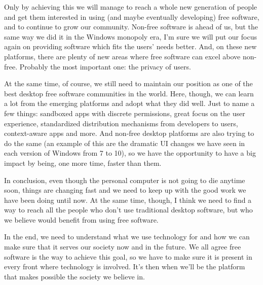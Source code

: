 Only by achieving this we will manage to reach a whole new generation of people and get them interested in using (and maybe eventually developing) free software, and to continue to grow our community. Non-free software is ahead of us, but the same way we did it in the Windows monopoly era, I’m sure we will put our focus again on providing software which fits the users’ needs better. And, on these new platforms, there are plenty of new areas where free software can excel above non-free. Probably the most important one: the privacy of users.

At the same time, of course, we still need to maintain our position as one of the best desktop free software communities in the world. Here, though, we can learn a lot from the emerging platforms and adopt what they did well. Just to name a few things: sandboxed apps with discrete permissions, great focus on the user experience, standardized distribution mechanisms from developers to users, context-aware apps and more. And non-free desktop platforms are also trying to do the same (an example of this are the dramatic UI changes we have seen in each version of Windows from 7 to 10), so we have the opportunity to have a big impact by being, one more time, faster than them.

In conclusion, even though the personal computer is not going to die anytime soon, things are changing fast and we need to keep up with the good work we have been doing until now. At the same time, though, I think we need to find a way to reach all the people who don't use traditional desktop software, but who we believe would benefit from using free software.

In the end, we need to understand what we use technology for and how we can make sure that it serves our society now and in the future. We all agree free software is the way to achieve this goal, so we have to make sure it is present in every front where technology is involved. It’s then when we’ll be the platform that makes possible the society we believe in.